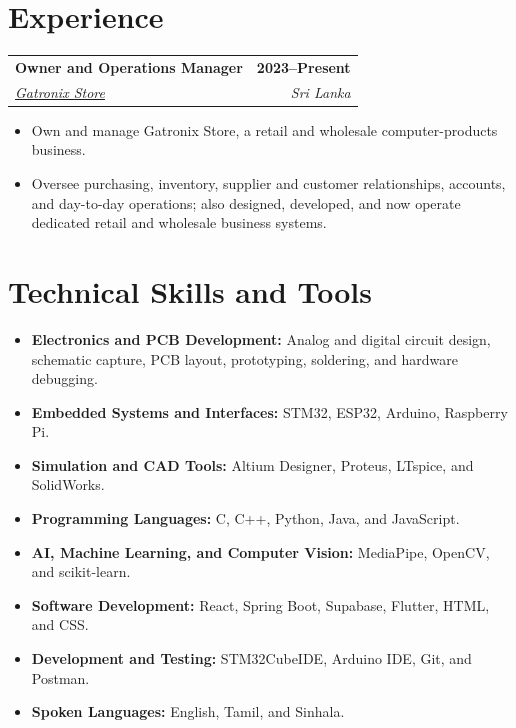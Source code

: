 \documentclass[a4paper,10pt]{article}
\makeatletter
\newcommand{\educationEntry}[4]{%
  \begin{tabularx}{\textwidth}{@{}Xr@{}}
    \textbf{#1} & \textbf{\small #2} \\
    \textit{#3} & \textit{\small #4}
  \end{tabularx}
}
\makeatother
\begin{document}
\vspace{1.1mm}

\section{Experience}

\educationEntry
  {Owner and Operations Manager}
  {2023--Present}
  {\href{https://maps.app.goo.gl/z9wBnqUMZs5da7UM9}{Gatronix Store \faMapMarker}}
  {Sri Lanka}

\begin{itemize}
  \item Own and manage Gatronix Store, a retail and wholesale computer-products business.
  \item Oversee purchasing, inventory, supplier and customer relationships, accounts, and day-to-day operations; also designed, developed, and now operate dedicated retail and wholesale business systems.
\end{itemize}

\section{Technical Skills and Tools}
\begin{itemize}[itemsep=0.8mm,topsep=0.45mm]
  \item \textbf{Electronics and PCB Development:} Analog and digital circuit design, schematic capture, PCB layout, prototyping, soldering, and hardware debugging.
  \item \textbf{Embedded Systems and Interfaces:} STM32, ESP32, Arduino, Raspberry Pi.
  \item \textbf{Simulation and CAD Tools:} Altium Designer,  Proteus, LTspice, and SolidWorks.
  \item \textbf{Programming Languages:} C, C++, Python, Java, and JavaScript.
  \item \textbf{AI, Machine Learning, and Computer Vision:} MediaPipe, OpenCV, and scikit-learn.
  \item \textbf{Software Development:} React, Spring Boot, Supabase, Flutter, HTML, and CSS.
  \item \textbf{Development and Testing:} STM32CubeIDE, Arduino IDE, Git, and Postman.
  \item \textbf{Spoken Languages:} English, Tamil, and Sinhala.
\end{itemize}
\end{document}
